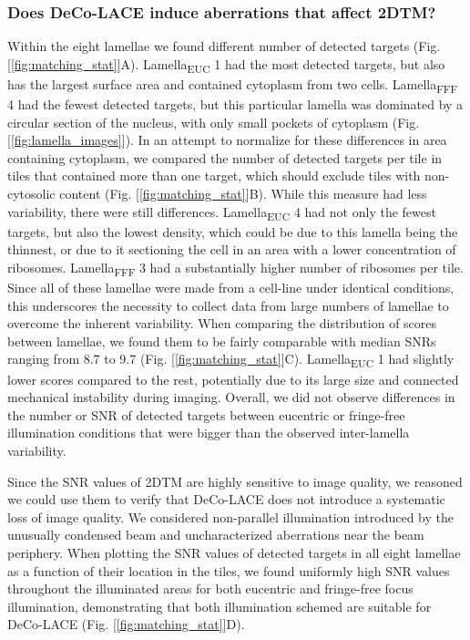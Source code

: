 \documentclass[
]{article}
\begin{document}
\hypertarget{does-deco-lace-induce-aberrations-that-affect-2dtm}{%
\subsubsection{Does DeCo-LACE induce aberrations that affect 2DTM?}\label{does-deco-lace-induce-aberrations-that-affect-2dtm}}

Within the eight lamellae we found different number of detected targets (Fig.
{[}\ref{fig:matching_stat}{]}A). Lamella\textsubscript{EUC} 1 had the most detected targets, but also has
the largest surface area and contained cytoplasm from two cells. Lamella\textsubscript{FFF} 4
had the fewest detected targets, but this particular lamella was dominated by a
circular section of the nucleus, with only small pockets of cytoplasm (Fig.
{[}\ref{fig:lamella_images}{]}). In an attempt to normalize for these differences in
area containing cytoplasm, we compared the number of detected targets per tile in
tiles that contained more than one target, which should exclude tiles with
non-cytosolic content (Fig. {[}\ref{fig:matching_stat}{]}B). While this measure had
less variability, there were still differences. Lamella\textsubscript{EUC} 4 had not only the
fewest targets, but also the lowest density, which could be due to this lamella being the
thinnest, or due to it sectioning the cell in an area with a lower concentration of
ribosomes. Lamella\textsubscript{FFF} 3 had a substantially higher number of ribosomes per
tile. Since all of these lamellae were made from a cell-line under identical
conditions, this underscores the necessity to collect data from large numbers of
lamellae to overcome the inherent variability. When comparing the distribution of
scores between lamellae, we found them to be fairly comparable with median
SNRs ranging from 8.7 to 9.7 (Fig. {[}\ref{fig:matching_stat}{]}C). Lamella\textsubscript{EUC} 1 had slightly lower scores compared
to
the rest, potentially due to its large size and connected mechanical instability
during imaging. Overall, we did not observe differences in the number or SNR of
detected targets between eucentric or fringe-free illumination conditions that
were bigger than the observed inter-lamella variability.

Since the SNR values of 2DTM are highly sensitive to image quality, we reasoned
we could use them to verify that DeCo-LACE does not introduce a systematic loss
of image quality. We considered non-parallel illumination introduced by the
unusually condensed beam and uncharacterized aberrations near the beam
periphery. When plotting the SNR values of detected targets in all eight
lamellae as a function of their location in the tiles, we found uniformly high
SNR values throughout the illuminated areas for both eucentric and fringe-free
focus illumination, demonstrating that both illumination schemed are suitable
for DeCo-LACE (Fig. {[}\ref{fig:matching_stat}{]}D).
\end{document}
